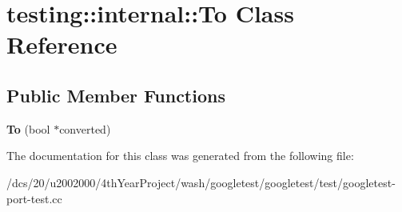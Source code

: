 \hypertarget{classtesting_1_1internal_1_1To}{}\section{testing\+:\+:internal\+:\+:To Class Reference}
\label{classtesting_1_1internal_1_1To}
\subsection*{Public Member Functions}
\begin{DoxyCompactItemize}
\item 
\mbox{\label{classtesting_1_1internal_1_1To_a447354e55d855ed0f1a1de8b2b54d345}} 
{\bfseries To} (bool $\ast$converted)
\end{DoxyCompactItemize}


The documentation for this class was generated from the following file\+:\begin{DoxyCompactItemize}
\item 
/dcs/20/u2002000/4th\+Year\+Project/wash/googletest/googletest/test/googletest-\/port-\/test.\+cc\end{DoxyCompactItemize}
